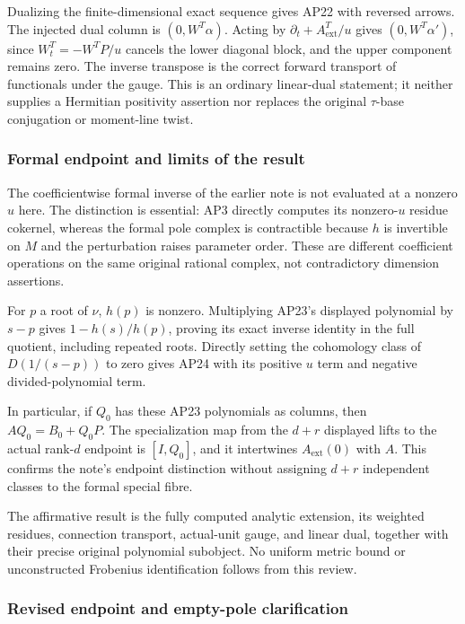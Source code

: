 Dualizing the finite-dimensional exact sequence gives AP22 with reversed arrows. The injected dual column is \((0,W^T\alpha)\). Acting by \(\partial_t+A_{\mathrm{ext}}^T/u\) gives \((0,W^T\alpha')\), since \(W_t^T=-W^T P/u\) cancels the lower diagonal block, and the upper component remains zero. The inverse transpose is the correct forward transport of functionals under the gauge. This is an ordinary linear-dual statement; it neither supplies a Hermitian positivity assertion nor replaces the original \(\tau\)-base conjugation or moment-line twist.

\subsubsection{Formal endpoint and limits of the result}\label{endpoint-analytic_pole_review--formal-endpoint-and-limits-of-the-result}

The coefficientwise formal inverse of the earlier note is not evaluated at a nonzero \(u\) here. The distinction is essential: AP3 directly computes its nonzero-\(u\) residue cokernel, whereas the formal pole complex is contractible because \(h\) is invertible on \(M\) and the perturbation raises parameter order. These are different coefficient operations on the same original rational complex, not contradictory dimension assertions.

For \(p\) a root of \(\nu\), \(h(p)\) is nonzero. Multiplying AP23's displayed polynomial by \(s-p\) gives \(1-h(s)/h(p)\), proving its exact inverse identity in the full quotient, including repeated roots. Directly setting the cohomology class of \(D(1/(s-p))\) to zero gives AP24 with its positive \(u\) term and negative divided-polynomial term.

In particular, if \(Q_0\) has these AP23 polynomials as columns, then \(A Q_0=B_0+Q_0 P\). The specialization map from the \(d+r\) displayed lifts to the actual rank-\(d\) endpoint is \([I,Q_0]\), and it intertwines \(A_{\mathrm{ext}}(0)\) with \(A\). This confirms the note's endpoint distinction without assigning \(d+r\) independent classes to the formal special fibre.

The affirmative result is the fully computed analytic extension, its weighted residues, connection transport, actual-unit gauge, and linear dual, together with their precise original polynomial subobject. No uniform metric bound or unconstructed Frobenius identification follows from this review.

\subsubsection{Revised endpoint and empty-pole clarification}\label{endpoint-analytic_pole_review--revised-endpoint-and-empty-pole-clarification}

